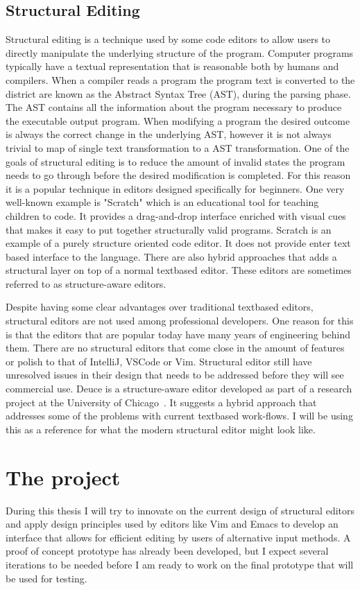\documentclass[a4paper,english]{ifimaster}
\begin{document}
\section{Structural Editing}
Structural editing is a technique used by some code editors to allow users to directly manipulate the underlying structure of the program.
Computer programs typically have a textual representation that is reasonable both by humans and compilers.
When a compiler reads a program the program text is converted to the district are known as the Abstract Syntax Tree (AST), during the parsing phase.
The AST contains all the information about the program necessary to produce the executable output program.
When modifying a program the desired outcome is always the correct change in the underlying AST, however it is not always
trivial to map of single text transformation to a AST transformation.
One of the goals of structural editing is to reduce the amount of invalid states the program needs to go through
before the desired modification is completed.
For this reason it is a popular technique in editors designed specifically for beginners.
One very well-known example is "Scratch" which is an educational tool for teaching children to code.
It provides a drag-and-drop interface enriched with visual cues that makes it easy to
put together structurally valid programs.
Scratch is an example of a purely structure oriented code editor.
It does not provide enter text based interface to the language.
There are also hybrid approaches that adds a structural layer on top of a normal textbased editor.
These editors are sometimes referred to as structure-aware editors.

Despite having some clear advantages over traditional textbased editors, structural editors are not used among professional developers.
One reason for this is that the editors that are popular today have many years of engineering behind them.
There are no structural editors that come close in the amount of features or polish to that of IntelliJ, VSCode or Vim.
Structural editor still have unresolved issues in their design that needs to be addressed before they will see commercial use.
Deuce is a structure-aware editor developed as part of a research project at the University of Chicago~\parencite{deuce}.
It suggests a hybrid approach that addresses some of the problems with current textbased work-flows.
I will be using this as a reference for what the modern structural editor might look like.

\chapter{The project}
During this thesis I will try to innovate on the current design of structural editors
and apply design principles used by editors like Vim and Emacs to develop an interface
that allows for efficient editing by users of alternative input methods.
A proof of concept prototype has already been developed, but I expect several iterations
to be needed before I am ready to work on the final prototype that will be used for testing.
\end{document}
